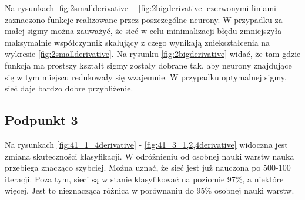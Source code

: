 \documentclass[a4paper, portrait,11pt]{article}
\begin{document}
Na rysunkach \ref{fig:2smallderivative} - \ref{fig:2bigderivative} czerwonymi liniami zaznaczono funkcje realizowane przez poszczególne neurony.
W przypadku za małej sigmy można zauważyć, że sieć w celu minimalizacji błędu zmniejszyła maksymalnie współczynnik skalujący z czego wynikają zniekształcenia na wykresie \ref{fig:2smallderivative}.
Na rysunku \ref{fig:2bigderivative} widać, że tam gdzie funkcja ma prostszy kształt sigmy zostały dobrane tak, aby neurony znajdujące się w tym miejscu redukowały się wzajemnie.
W przypadku optymalnej sigmy, sieć daje bardzo dobre przybliżenie.

\subsection{Podpunkt 3}

Na rysunkach \ref{fig:41_1_4derivative} - \ref{fig:41_3_1,2,4derivative} widoczna jest zmiana skuteczności klasyfikacji.
W odróżnieniu od osobnej nauki warstw nauka przebiega znacząco szybciej. Można uznać, że sieć jest już nauczona po 500-100 iteracji.
Poza tym, sieci są w stanie klasyfikować na poziomie 97\%, a niektóre więcej. Jest to nieznacząca różnica w porównaniu do 95\% osobnej nauki warstw.
\end{document}
